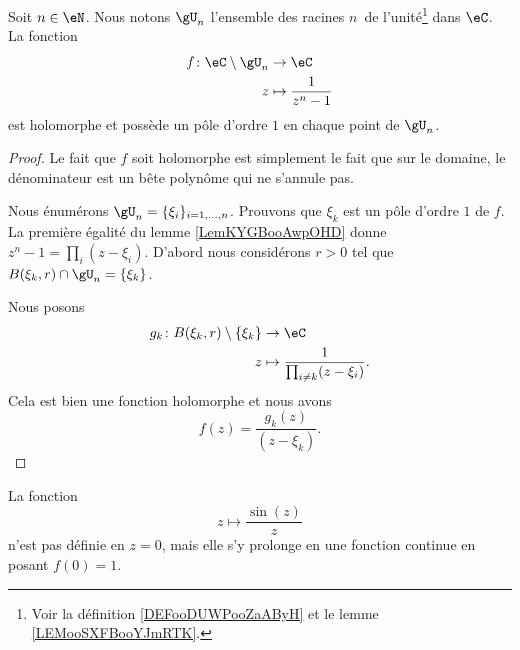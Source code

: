 \begin{lemma}
    Soit \( n\in \eN\). Nous notons \( \gU_n\) l'ensemble des racines \( n\)\ieme\ de l'unité\footnote{Voir la définition \ref{DEFooDUWPooZaAByH} et le lemme \ref{LEMooSXFBooYJmRTK}.} dans \( \eC\). La fonction
    \begin{equation}
        \begin{aligned}
            f\colon \eC\setminus\gU_n&\to \eC \\
            z&\mapsto \frac{1}{ z^n-1 } 
        \end{aligned}
    \end{equation}
    est holomorphe et possède un pôle d'ordre \( 1\) en chaque point de \( \gU_n\).
\end{lemma}

\begin{proof}
    Le fait que \( f\) soit holomorphe est simplement le fait que sur le domaine, le dénominateur est un bête polynôme qui ne s'annule pas. 

    Nous énumérons \( \gU_n = \{ \xi_i \}_{i=1,\ldots, n}\). Prouvons que \( \xi_k\) est un pôle d'ordre \( 1\) de \( f\). La première égalité du lemme \ref{LemKYGBooAwpOHD} donne \( z^n-1=\prod_i(z-\xi_i)\). D'abord nous considérons \( r>0\) tel que \( B(\xi_k,r)\cap \gU_n=\{ \xi_k \}\).

    Nous posons
    \begin{equation}
        \begin{aligned}
            g_k\colon B(\xi_k,r)\setminus\{ \xi_k \}&\to \eC \\
            z&\mapsto \frac{1}{ \prod_{i\neq k}(z-\xi_i) }. 
        \end{aligned}
    \end{equation}
    Cela est bien une fonction holomorphe et nous avons 
    \begin{equation}
        f(z)=\frac{ g_k(z) }{ (z-\xi_k) }.
    \end{equation}
\end{proof}

\begin{example}
    La fonction
    \begin{equation}
        z\mapsto \frac{ \sin(z) }{ z }
    \end{equation}
    n'est pas définie en \( z=0\), mais elle s'y prolonge en une fonction continue en posant \( f(0)=1\).
\end{example}

